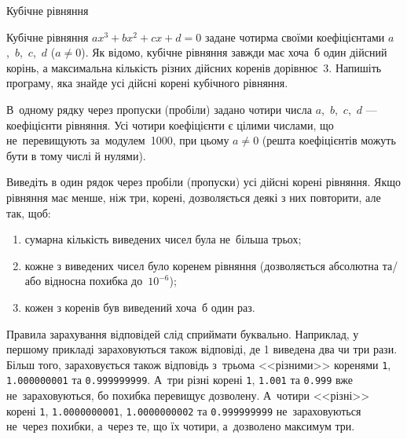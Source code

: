 ﻿\begin{problemAllDefault}{Кубічне рівняння}

Кубічне рівняння $ax^3+bx^2+cx+d=0$ задане чотирма своїми коефіцієнтами $a$,~$b$,~$c$,~$d$ ($a\neq 0$).
Як відомо, кубічне рівняння завжди має хоча~б один дійсний корінь, а максимальна кількість різних дійсних коренів дорівнює~3.
Напишіть програму, яка знайде усі дійсні корені кубічного рівняння.

\InputFile
В~одному рядку через пропуски (пробіли) задано чотири числа $a$,~$b$,~$c$,~$d$ --- коефіцієнти рівняння. Усі чотири коефіцієнти є цілими числами, що не~перевищують за~модулем~1000, при цьому $a\neq 0$ (решта коефіцієнтів можуть бути в тому числі й нулями).

\OutputFile
Виведіть в один рядок через пробіли (пропуски) усі дійсні корені рівняння. Якщо рівняння має менше, ніж три, корені, дозволяється деякі з них повторити, але так, щоб:
\begin{enumerate}
\item
сумарна кількість виведених чисел була не~більша трьох;
\item
кожне з виведених чисел було коренем рівняння (дозволяється абсолютна та/або відносна похибка до~$10^{-6}$);
\item
кожен з коренів був виведений хоча~б один раз.
\end{enumerate}

\Examples

\begin{example}
%
%
\end{example}

\Note
Правила зарахування відповідей слід сприймати буквально. Наприклад, у першому прикладі зараховуються також відповіді, де 1 виведена два чи три рази. Більш того, зараховується також відповідь з~трьома <<різними>> коренями \verb"1", \verb"1.000000001" та \verb"0.999999999". А~три різні корені \verb"1", \verb"1.001" та \verb"0.999" вже не~зараховуються, бо похибка перевищує дозволену. А~чотири <<різні>> корені \verb"1", \verb"1.0000000001", \verb"1.0000000002" та \verb"0.999999999" не~зараховуються не~через похибки, а~через те, що їх чотири, а~дозволено максимум три.


\end{problemAllDefault}

